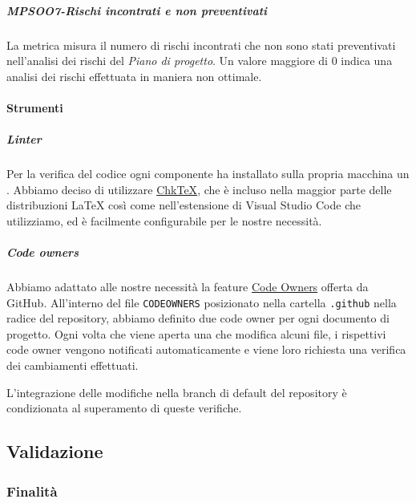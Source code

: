 \documentclass[../norme-di-progetto.tex]{subfiles}
\begin{document}
\subparagraph{MPSOO7-Rischi incontrati e non preventivati}%
\label{subp:MPS007-rischi_incontrati_e_non_preventivati}

La metrica misura il numero di rischi incontrati che non sono stati preventivati nell'analisi dei rischi del \textit{Piano di progetto}. Un valore maggiore di 0 indica una analisi dei rischi effettuata in maniera non ottimale.
\paragraph{Strumenti}%
\label{par:verifica/descrizione/strumenti}

\subparagraph{Linter}%
\label{subp:linter}

Per la verifica del codice ogni componente ha installato sulla propria macchina un .
Abbiamo deciso di utilizzare \href{https://www.nongnu.org/chktex/}{Chk\TeX}, che è incluso nella maggior parte delle distribuzioni \LaTeX{} così come nell'estensione di Visual Studio Code che utilizziamo, ed è facilmente configurabile per le nostre necessità.

\subparagraph{Code owners}%
\label{subp:code_owners}

Abbiamo adattato alle nostre necessità la feature \href{https://help.github.com/en/github/creating-cloning-and-archiving-repositories/about-code-owners}{Code Owners} offerta da GitHub.
All'interno del file \verb|CODEOWNERS| posizionato nella cartella \verb|.github| nella radice del repository, abbiamo definito due code owner per ogni documento di progetto.
Ogni volta che viene aperta una  che modifica alcuni file, i rispettivi code owner vengono notificati automaticamente e viene loro richiesta una verifica dei cambiamenti effettuati.

L'integrazione delle modifiche nella branch di default del repository è condizionata al superamento di queste verifiche.

\subsection{Validazione}%
\label{sub:validazione}

\subsubsection{Finalità}%
\label{subs:validazione/finalita}
\end{document}
